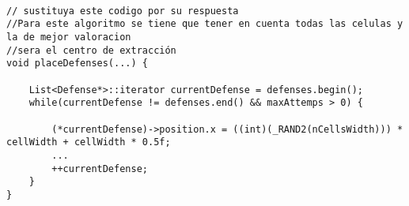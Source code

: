 \begin{lstlisting}

// sustituya este codigo por su respuesta
//Para este algoritmo se tiene que tener en cuenta todas las celulas y la de mejor valoracion 
//sera el centro de extracción  
void placeDefenses(...) {

    List<Defense*>::iterator currentDefense = defenses.begin();
    while(currentDefense != defenses.end() && maxAttemps > 0) {

        (*currentDefense)->position.x = ((int)(_RAND2(nCellsWidth))) * cellWidth + cellWidth * 0.5f;
        ...
        ++currentDefense;
    }
}

\end{lstlisting}